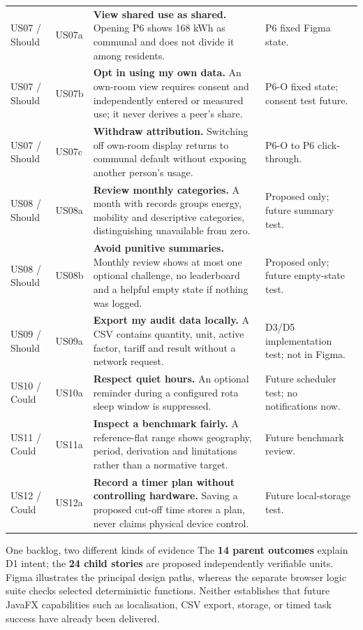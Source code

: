 \documentclass[12pt,a4paper]{article}
\begin{document}
\begin{longtable}{|>{\raggedright\arraybackslash}p{1.75cm}|>{\raggedright\arraybackslash}p{1.07cm}|>{\raggedright\arraybackslash}p{6.45cm}|>{\raggedright\arraybackslash}p{3.3cm}|}
\rowcolor{RowGray}US07 / Should & US07a & \textbf{View shared use as shared.} Opening P6 shows 168 kWh as communal and does not divide it among residents. & P6 fixed Figma state.\\
US07 / Should & US07b & \textbf{Opt in using my own data.} An own-room view requires consent and independently entered or measured use; it never derives a peer's share. & P6-O fixed state; consent test future.\\
\rowcolor{RowGray}US07 / Should & US07c & \textbf{Withdraw attribution.} Switching off own-room display returns to communal default without exposing another person's usage. & P6-O to P6 click-through.\\
US08 / Should & US08a & \textbf{Review monthly categories.} A month with records groups energy, mobility and descriptive categories, distinguishing unavailable from zero. & Proposed only; future summary test.\\
\rowcolor{RowGray}US08 / Should & US08b & \textbf{Avoid punitive summaries.} Monthly review shows at most one optional challenge, no leaderboard and a helpful empty state if nothing was logged. & Proposed only; future empty-state test.\\
US09 / Should & US09a & \textbf{Export my audit data locally.} A CSV contains quantity, unit, active factor, tariff and result without a network request. & D3/D5 implementation test; not in Figma.\\
\rowcolor{RowGray}US10 / Could & US10a & \textbf{Respect quiet hours.} An optional reminder during a configured rota sleep window is suppressed. & Future scheduler test; no notifications now.\\
US11 / Could & US11a & \textbf{Inspect a benchmark fairly.} A reference-flat range shows geography, period, derivation and limitations rather than a normative target. & Future benchmark review.\\
\rowcolor{RowGray}US12 / Could & US12a & \textbf{Record a timer plan without controlling hardware.} Saving a proposed cut-off time stores a plan, never claims physical device control. & Future local-storage test.\\
\end{longtable}
\endgroup

\begin{insightbox}{One backlog, two different kinds of evidence}
The \textbf{14 parent outcomes} explain D1 intent; the \textbf{24 child stories} are proposed independently verifiable units. Figma illustrates the principal design paths, whereas the separate browser logic suite checks selected deterministic functions. Neither establishes that future JavaFX capabilities such as localisation, CSV export, storage, or timed task success have already been delivered.
\end{insightbox}
\end{document}
